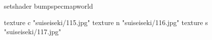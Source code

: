 setshader bumpspecmapworld

    texture c "suiseiseki/115.jpg"
    texture n "suiseiseki/116.jpg"
    texture s "suiseiseki/117.jpg"
